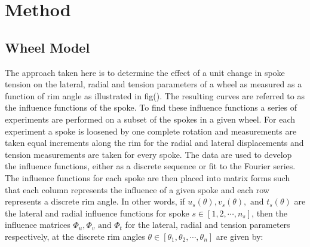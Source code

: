 \documentclass[journal]{IEEEtran}
\begin{document}
\section{Method}

\subsection{Wheel Model}
The approach taken here is to determine the effect of a unit change in spoke tension on the lateral, radial and tension parameters of a wheel as measured as a function of rim angle as illustrated in fig().  The resulting curves are referred to as the influence functions of the spoke. To find these influence functions a series of experiments are performed on a subset of the spokes in a given wheel.  For each experiment a spoke is loosened by one complete rotation and measurements are taken equal increments along the rim for the radial and lateral displacements and tension measurements are taken for every spoke. The data are used to develop the influence functions, either as a discrete sequence or fit to the Fourier series. The influence functions for each spoke are then placed into matrix forms such that each column represents the influence of a given spoke and each row represents a discrete rim angle.  In other words, if $u_s (\theta), v_s(\theta), \text{ and }t_s(\theta)$ are the lateral and radial influence functions for spoke $s \in [1,2, \cdots , n_s]$, then the influence matrices $\Phi_u, \Phi_v \text{ and } \Phi_t$  for the lateral, radial and tension parameters respectively, at the discrete rim angles $\theta \in [\theta_1,\theta_2,\cdots, \theta_n]$ are given by:
\end{document}

